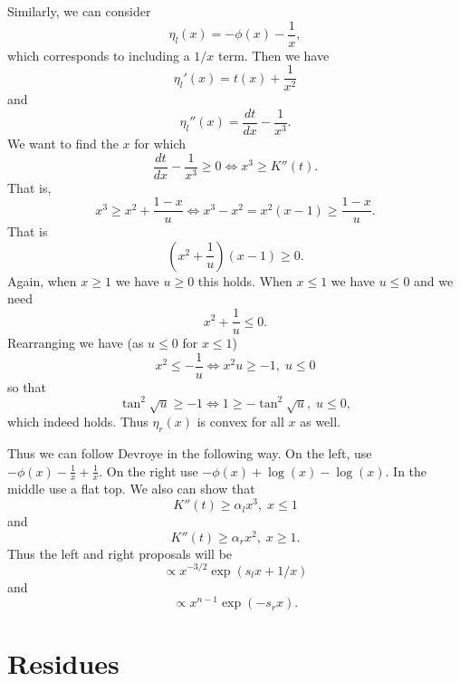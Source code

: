 \documentclass[12pt]{article}
\newcommand{\dd}[2]{\frac{d #1}{d #2}}
\begin{document}
Similarly, we can consider
\[
\eta_l(x) = - \phi(x) - \frac{1}{x},
\]
which corresponds to including a $1/x$ term.  Then we have
\[
\eta_l'(x) = t(x) + \frac{1}{x^2}
\]
and
\[
\eta_l''(x) = \dd{t}{x} - \frac{1}{x^3}.
\]
We want to find the $x$ for which
\[
\dd{t}{x} - \frac{1}{x^3} \geq 0 \iff x^3 \geq K''(t).
\]
That is,
\[
x^3 \geq x^2 + \frac{1-x}{u} \iff x^3 - x^2 = x^2 (x-1) \geq \frac{1-x}{u}.
\]
That is
\[
(x^2 + \frac{1}{u}) (x-1) \geq 0.
\]
Again, when $x \geq 1$ we have $u \geq 0$ this holds.  When $x \leq 1$ we have
$u \leq 0$ and we need
\[
x^2 + \frac{1}{u} \leq 0.
\]
Rearranging we have (as $u \leq 0$ for $x \leq 1$)
\[
x^2 \leq - \frac{1}{u} \iff x^2 u \geq -1,  \; u \leq 0
\]
so that
\[
\tan^2 \sqrt{u} \geq -1 \iff 1 \geq -\tan^2{\sqrt{u}}, \; u \leq 0,
\]
which indeed holds.  Thus $\eta_r(x)$ is convex for all $x$ as well.

Thus we can follow Devroye in the following way.  On the left, use $-\phi(x) -
\frac{1}{x} + \frac{1}{x}$.  On the right use $-\phi(x) + \log(x) - \log(x)$.
In the middle use a flat top.  We also can show that
\[
K''(t) \geq \alpha_l x^3, \; x \leq 1
\]
and
\[
K''(t) \geq \alpha_r x^2, \; x \geq 1.
\]
Thus the left and right proposals will be
\[
\propto x^{-3/2} \exp( s_l x + 1/x )
\]
and
\[
\propto x^{n-1} \exp (- s_r x).
\]

\section{Residues}
\end{document}
